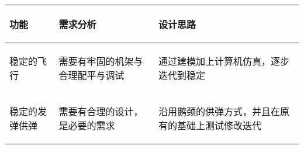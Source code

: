 
\begin{longtable}{ p{2cm} | p{7.8cm} | p{6cm} |}

    \hline

    \endfoot
    
    \rowcolor{tabhdcolor}

        \begin{center}
            功能
        \end{center} &
        \begin{center}
            需求分析
        \end{center} &
        \begin{center}
            设计思路
        \end{center} \\

    \hline

    \endhead

        \begin{center}
            稳定的飞行
        \end{center} &
        \begin{center}
            需要有牢固的机架与合理配平与调试
        \end{center} &
        \begin{center}
            通过建模加上计算机仿真，逐步迭代到稳定
        \end{center} \\
        
    \hline

        \begin{center}
            稳定的发弹供弹
        \end{center} &
        \begin{center}
            需要有合理的设计，是必要的需求
        \end{center} &
        \begin{center}
            沿用鹅颈的供弹方式，并且在原有的基础上测试修改迭代
        \end{center} \\
        

\end{longtable}
